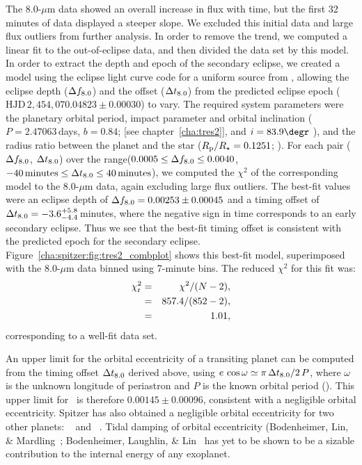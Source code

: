 The 8.0-$\mu$m data showed an overall increase in flux with time, but the first 32 minutes of data displayed a steeper slope.
We excluded this initial data and large flux outliers from further analysis.
In order to remove the trend, we computed a linear fit to the out-of-eclipse data, and then divided the data set by this model.
In order to extract the depth and epoch of the secondary eclipse, we created a model using the eclipse light curve code for a uniform source from \citet{Mandel_Agol:apjl:2002a}, allowing the eclipse depth ($\Delta f_{\rm {8.0}}$) and the offset ($\Delta t_{\rm {8.0}} $) from the predicted eclipse epoch (\mbox{$\mathrm{HJD}\,2,\!454,\!070.04823\pm0.00030$}) to vary.
The required system parameters were the planetary orbital period, impact parameter and orbital inclination (\mbox{$P=2.47063$\,days}, \mbox{$b=0.84$}; \citealt{ODonovan_Charbonneau_Mandushev:apjl:2006a} [see chapter~\ref{cha:tres2}], and \mbox{$i=83.9\degr$} \citealt{Holman_Winn_Latham:apj:2007a}), and the radius ratio between the planet and the star (\mbox{$R_{\rm p}/R_{\star}=0.1251$};  \citealt{Holman_Winn_Latham:apj:2007a}).
For each pair ($\Delta f_{\rm {8.0}}$, $\Delta t_{\rm {8.0}}$) over the range($0.0005 \le \Delta f_{\rm 8.0} \le 0.0040$, $-40\,\mathrm{minutes} \le \Delta t_{\rm {8.0}} \le 40\,\mathrm{minutes}$), we computed the $\chi^{2}$ of the corresponding model to the 8.0-$\mu$m data, again excluding large flux outliers.
The best-fit values were an eclipse depth of $\Delta f_{\rm {8.0}} = 0.00253 \pm 0.00045$ and a timing offset of $\Delta t_{\rm {8.0}} = -3.6^{+5.8}_{-4.4}$\,minutes, where the negative sign in time corresponds to an early secondary eclipse.
Thus we see that the best-fit timing offset is consistent with the predicted epoch for the secondary eclipse.
Figure~\ref{cha:spitzer:fig:tres2_combplot} shows this best-fit model, superimposed with the 8.0-$\mu$m data binned using 7-minute bins.
The reduced $\chi^{2}$ for this fit was:
\begin{eqnarray*}
\chi_{\rm r}^{2} & = & \chi^{2}/(N-2), \\
 & = & 857.4/(852-2), \\
 & = & 1.01,
\end{eqnarray*}
corresponding to a well-fit data set.

An upper limit for the orbital eccentricity of a transiting planet can be computed from the timing offset $\Delta t_{\rm {8.0}}$ derived above, using $e \, \cos{\omega} \simeq \pi \, \Delta t_{\rm 8.0}/2 \, P$, where $\omega$ is the unknown longitude of periastron and $P$ is the known orbital period (\citealp[see equation~4 of][]{Charbonneau_Allen_Megeath:apj:2005a}).
This upper limit for \tresTwo\ is therefore \mbox{$0.00145\pm0.00096$}, consistent with a negligible orbital eccentricity.
Spitzer has also obtained a negligible orbital eccentricity for two other planets: \hdTZNb\ \citep{Deming_Seager_Richardson:nat:2005a} and \tresOne\ \citep{Charbonneau_Allen_Megeath:apj:2005a}.
Tidal damping of orbital eccentricity (Bodenheimer, Lin, \& Mardling~\citeyear{Bodenheimer_Lin_Mardling:apj:2001a}; Bodenheimer, Laughlin, \& Lin~\citeyear{Bodenheimer_Laughlin_Lin:apj:2003a} has yet to be shown to be a sizable contribution to the internal energy of any exoplanet.

